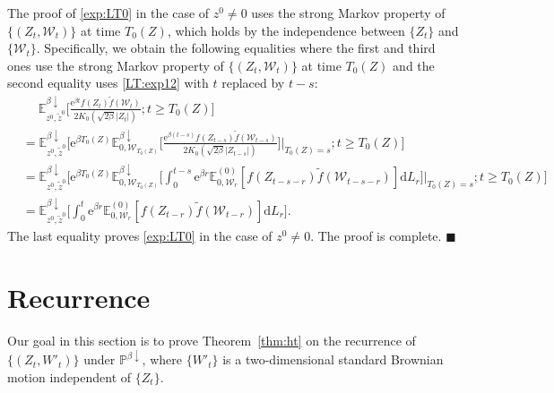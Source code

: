 \documentclass[12pt, twoside]{article}
\numberwithin{figure}{section}
\newcommand{\e}{{\mathrm e}}
\newcommand{\1}{\mathds 1}
\newcommand{\da}{{\downarrow}}
\renewcommand{\P}{{\mathbb P}}
\newcommand{\E}{{\mathbb E}}
\newcommand{\mc}{\mathcal}
\renewcommand{\d}{{\mathrm d}}
\newcommand{\2}{{\mathbf 1}}
\renewenvironment{proof}[1][\proofname]{\noindent {\bfseries #1.}\;}{\hfill\ensuremath{\blacksquare}\\}
\begin{document}
\begin{proof}[Proof of Theorem~\ref{thm:formulas}]
The proof of \eqref{exp:LT0} in the case of $z^0\neq 0$ uses the strong Markov property of $\{(Z_t,\mc W_t)\}$ at time $T_0(Z)$, which holds by the independence between $\{Z_t\}$ and $\{\mc W_t\}$. Specifically, we obtain the following equalities where the first and third ones use the strong Markov property of $\{(Z_t,\mc W_t)\}$ at time $T_0(Z)$ and the second equality uses  \eqref{LT:exp12} with $t$ replaced by $t-s$:
\begin{align*}
&\quad \;\E^{\beta\da}_{z^0,\tilde{z}^0}\Biggl[\frac{\e^{\beta t}f(Z_t)\tilde{f}(\mc W_t)}{2K_0(\sqrt{2\beta}|Z_t|)};t\geq T_0(Z)\Biggr]\\
&=
\E^{\beta\da}_{z^0,\tilde{z}^0}\Biggl[\e^{\beta T_0(Z)}\E^{\beta\da}_{0,\mc W_{T_0(Z)}}\Biggl[\frac{\e^{\beta (t-s)}f(Z_{t-s})\tilde{f}(\mc W_{t-s})}{2K_0(\sqrt{2\beta}|Z_{t-s}|)}\Biggr]\Bigg|_{T_0(Z)=s};t\geq T_0(Z)\Biggr]\\
&=
\E^{\beta\da}_{z^0,\tilde{z}^0}\Biggl[\e^{\beta T_0(Z)}
\E^{\beta\da }_{0,\mc W_{T_0(Z)}}\Biggl[\int_0^{t-s}\!\!\!\e^{\beta r}\E^{(0)}_{0,\mc W_ r}[f(Z_{t-s- r})\tilde{f}(\mc W_{t-s- r})]\d L_ r\Biggr]
\Bigg|_{T_0(Z)=s}\!\!\!;t\geq T_0(Z)\Biggr]\\
&=\E^{\beta\da }_{z^0,\tilde{z}^0}\Biggl[\int_0^t\e^{\beta r}\E^{(0)}_{0,\mc W_ r}[f(Z_{t- r})\tilde{f}(\mc W_{t- r})] \d L_ r\Biggr].
\end{align*}
The last equality proves \eqref{exp:LT0} in the case of $z^0\neq 0$. The proof is complete.
\end{proof}

\section{Recurrence}\label{sec:recurrence}
Our goal in this section is to prove Theorem~\ref{thm:ht} on the recurrence of $\{(Z_t,W'_t)\}$ under $\P^{\beta\da}$, where $\{W'_t\}$ is a two-dimensional standard Brownian motion independent of $\{Z_t\}$. 
\end{document}
